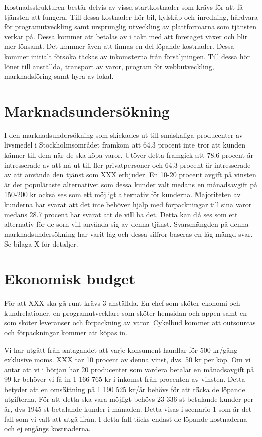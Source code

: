 \documentclass[10pt,a4paper,oneside]{article}
\begin{document}
Kostnadsstrukturen består delvis av vissa startkostnader som krävs för att få tjänsten att fungera. Till dessa kostnader hör bil, kylskåp och inredning, hårdvara för programutveckling samt ursprunglig utveckling av plattformarna som tjänsten verkar på. Dessa kommer att betalas av i takt med att företaget växer och blir mer lönsamt. Det kommer även att finnas en del löpande kostnader. Dessa kommer initialt försöka täckas av inkomsterna från försäljningen. Till dessa hör löner till anställda, transport av varor, program för webbutveckling, marknadsföring samt hyra av lokal.  


\newpage

\section{Marknadsundersökning}
I den marknadsundersökning som skickades ut till småskaliga producenter av livsmedel i Stockholmsområdet framkom att 64.3 procent inte tror att kunden känner till dem när de ska köpa varor. Utöver detta framgick att 78.6 procent är intresserade av att nå ut till fler privatpersoner och 64.3 procent är intresserade av att använda den tjänst som XXX erbjuder. En 10-20 procent avgift på vinsten är det populäraste alternativet som dessa kunder valt medans en månadsavgift på 150-200 kr också ses som ett möjligt alternativ för kunderna. Majoriteten av kunderna har svarat att det inte behöver hjälp med förpackningar till sina varor medans 28.7 procent har svarat att de vill ha det. Detta kan då ses som ett alternativ för de som vill använda sig av denna tjänst. Svarsmängden på denna marknadsundersökning har varit låg och dessa siffror baseras en låg mängd svar. Se bilaga X för detaljer. 

\newpage

\section{Ekonomisk budget}
För att XXX ska gå runt krävs 3 anställda. En chef som sköter ekonomi och kundrelationer, en programutvecklare som sköter hemsidan och appen samt en som sköter leveranser och förpackning av varor. Cykelbud kommer att outsourcas och förpackningar kommer att köpas in. 

Vi har utgått från antagandet att varje konsument handlar för 500 kr/gång exklusive moms. XXX tar 10 procent av denna vinst, dvs. 50 kr per köp. Om vi antar att vi i början har 20 producenter som vardera betalar en månadsavgift på 99 kr behöver vi få in 1 166 765 kr i inkomst från procenten av vinsten. Detta betyder att en omsättning på 1 190 525 kr/år behövs för att täcka de löpande utgifterna. För att detta ska vara möjligt behövs 23 336 st betalande kunder per år, dvs 1945 st betalande kunder i månaden. Detta visas i scenario 1 som är det fall som vi valt att utgå ifrån. I detta fall täcks endast de löpande kostnaderna och ej engångs kostnaderna. 
\end{document}
